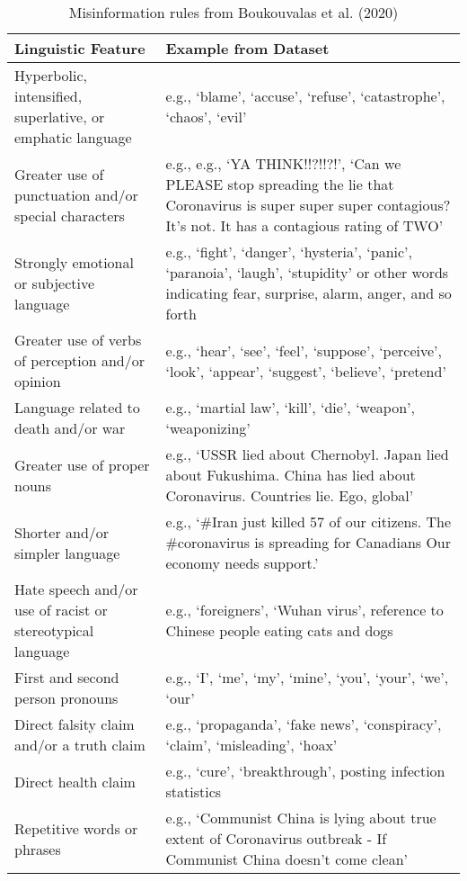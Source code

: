\documentclass{article}
\begin{document}
\begin{table}[htp]
 \caption{Misinformation rules from Boukouvalas et al. (2020)}
  \centering
  \begin{tabular}{p{6cm}|p{9cm}}
    \hline
    \textbf{Linguistic Feature} & \textbf{Example from Dataset} \\ [0.5 ex]
    \hline\hline
    Hyperbolic, intensified, superlative, or emphatic language & e.g., ‘blame’, ‘accuse’, ‘refuse’, ‘catastrophe’, ‘chaos’, ‘evil’ \\
    \hline
    Greater use of punctuation and/or special characters & e.g., e.g., ‘YA THINK!!?!!?!’, ‘Can we PLEASE stop spreading the lie that Coronavirus is super super super contagious? It’s not. It has a contagious rating of TWO’ \\
    \hline
    Strongly emotional or subjective language & e.g., ‘fight’, ‘danger’, ‘hysteria’, ‘panic’, ‘paranoia’, ‘laugh’, ‘stupidity’ or other words indicating fear, surprise, alarm, anger, and so forth \\
    \hline
    Greater use of verbs of perception and/or opinion & e.g., ‘hear’, ‘see’, ‘feel’, ‘suppose’, ‘perceive’, ‘look’, ‘appear’, ‘suggest’, ‘believe’, ‘pretend’ \\
    \hline
    Language related to death and/or war & e.g., ‘martial law’, ‘kill’, ‘die’, ‘weapon’, ‘weaponizing’ \\
    \hline
    Greater use of proper nouns & e.g., ‘USSR lied about Chernobyl. Japan lied about Fukushima. China has lied about Coronavirus. Countries lie. Ego, global’ \\
    \hline
    Shorter and/or simpler language & e.g., ‘\#Iran just killed 57 of our citizens. The \#coronavirus is spreading for Canadians Our economy needs support.’ \\
    \hline
    Hate speech and/or use of racist or stereotypical language & e.g., ‘foreigners’, ‘Wuhan virus’, reference to Chinese people eating cats and dogs \\
    \hline
    First and second person pronouns & e.g., ‘I’, ‘me’, ‘my’, ‘mine’, ‘you’, ‘your’, ‘we’, ‘our’ \\
    \hline
    Direct falsity claim and/or a truth claim & e.g., ‘propaganda’, ‘fake news’, ‘conspiracy’, ‘claim’, ‘misleading’, ‘hoax’ \\
    \hline
    Direct health claim & e.g., ‘cure’, ‘breakthrough’, posting infection statistics \\
    \hline
    Repetitive words or phrases & e.g., ‘Communist China is lying about true extent of Coronavirus outbreak - If Communist China doesn’t come clean’ \\

\end{tabular}
\end{table}
\end{document}
